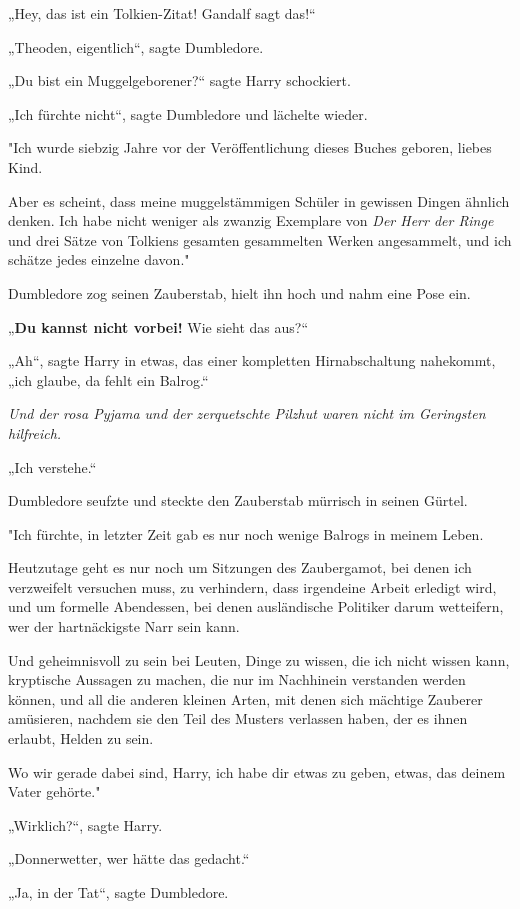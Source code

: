 {„Hey, das ist ein Tolkien-Zitat! Gandalf sagt das!“

„Theoden, eigentlich“, sagte Dumbledore.

„Du bist ein Muggelgeborener?“ sagte Harry schockiert.

„Ich fürchte nicht“, sagte Dumbledore und lächelte wieder.

"Ich wurde siebzig Jahre vor der Veröffentlichung dieses Buches geboren, liebes Kind.

Aber es scheint, dass meine muggelstämmigen Schüler in gewissen Dingen ähnlich denken. Ich habe nicht weniger als zwanzig Exemplare von \emph{Der Herr der Ringe} und drei Sätze von Tolkiens gesamten gesammelten Werken angesammelt, und ich schätze jedes einzelne davon."

Dumbledore zog seinen Zauberstab, hielt ihn hoch und nahm eine Pose ein.

„\textbf{Du kannst nicht vorbei!} Wie sieht das aus?“

„Ah“, sagte Harry in etwas, das einer kompletten Hirnabschaltung nahekommt, „ich glaube, da fehlt ein Balrog.“

\emph{Und der rosa Pyjama und der zerquetschte Pilzhut waren nicht im Geringsten hilfreich.}

„Ich verstehe.“

Dumbledore seufzte und steckte den Zauberstab mürrisch in seinen Gürtel.

"Ich fürchte, in letzter Zeit gab es nur noch wenige Balrogs in meinem Leben.

Heutzutage geht es nur noch um Sitzungen des Zaubergamot, bei denen ich verzweifelt versuchen muss, zu verhindern, dass irgendeine Arbeit erledigt wird, und um formelle Abendessen, bei denen ausländische Politiker darum wetteifern, wer der hartnäckigste Narr sein kann.

Und geheimnisvoll zu sein bei Leuten, Dinge zu wissen, die ich nicht wissen kann, kryptische Aussagen zu machen, die nur im Nachhinein verstanden werden können, und all die anderen kleinen Arten, mit denen sich mächtige Zauberer amüsieren, nachdem sie den Teil des Musters verlassen haben, der es ihnen erlaubt, Helden zu sein.

Wo wir gerade dabei sind, Harry, ich habe dir etwas zu geben, etwas, das deinem Vater gehörte."

„Wirklich?“, sagte Harry.

„Donnerwetter, wer hätte das gedacht.“

„Ja, in der Tat“, sagte Dumbledore.

}
